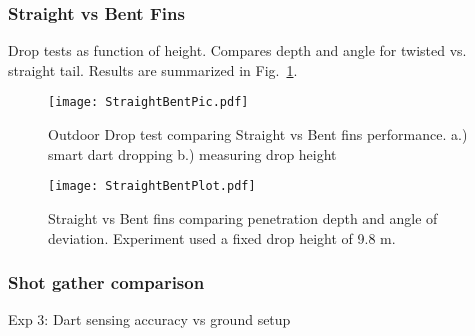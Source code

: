 \subsubsection{Straight vs Bent Fins}

Drop tests as function of height. Compares depth and angle for twisted vs. straight tail.
Results are summarized in Fig.~\ref{fig:StraightBentPic}.

\begin{figure} \centering
  {\texttt{[image: StraightBentPic.pdf]}}
 \caption{Outdoor Drop test comparing Straight vs Bent fins performance.
 a.)  smart dart dropping 
 b.)  measuring drop height} 
 \label{fig:StraightBentPic}
 \vspace{-1em}
\end{figure}
\begin{figure} \centering
  {\texttt{[image: StraightBentPlot.pdf]}}
 \caption{Straight vs Bent fins comparing penetration depth and angle of deviation. Experiment used a fixed drop height of 9.8 m.} 
 \label{fig:StraightBentPlot}
\end{figure}



\subsubsection{Shot gather comparison}
Exp 3: Dart sensing accuracy vs ground setup


 